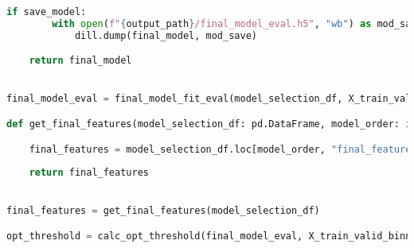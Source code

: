 \begin{lstlisting}[language=Python, basicstyle=\footnotesize\ttfamily]
    if save_model:
        with open(f"{output_path}/final_model_eval.h5", "wb") as mod_save:
            dill.dump(final_model, mod_save)

    return final_model


final_model_eval = final_model_fit_eval(model_selection_df, X_train_valid_binned_filtered, y_train_valid)

def get_final_features(model_selection_df: pd.DataFrame, model_order: int = 0) -> tuple[float, list]:

    final_features = model_selection_df.loc[model_order, "final_features"]
    
    return final_features


final_features = get_final_features(model_selection_df)

opt_threshold = calc_opt_threshold(final_model_eval, X_train_valid_binned_filtered, y_train_valid)
\end{lstlisting}

